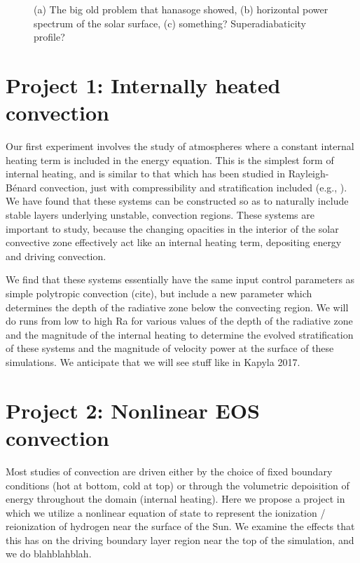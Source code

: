 \documentclass[aasms,12pt]{article}
\newcommand{\RB}{Rayleigh-B\'{e}nard }
\begin{document}
\begin{figure}[t!]
\centering
\caption{(a) The big old problem that hanasoge showed, (b) horizontal power spectrum of the
solar surface, (c) something? Superadiabaticity profile?
        \label{fig:fig1}}
\end{figure}



\section{Project 1: Internally heated convection}
Our first experiment involves the study of atmospheres where a constant internal heating
term is included in the energy equation.  This is the simplest form of internal heating,
and is similar to that which has been studied in \RB convection, just with compressibility
and stratification included (e.g., \citealt{goluskin&spiegel2012}).  
We have found that these systems can be constructed so as to
naturally include stable layers underlying unstable, convection regions.  These systems
are important to study, because the changing opacities in the interior of the solar convective
zone effectively act like an internal heating term, depositing energy and driving convection.

We find that these systems essentially have the same input control parameters as simple polytropic
convection (cite), but include a new parameter which determines the depth of the radiative zone
below the convecting region.  We will do runs from low to high Ra for various values of the
depth of the radiative zone and the magnitude of the internal heating to determine the evolved
stratification of these systems and the magnitude of velocity power at the surface of these
simulations.  We anticipate that we will see stuff like in Kapyla 2017.

\section{Project 2: Nonlinear EOS convection}
Most studies of convection are driven either by the choice of fixed boundary conditions
(hot at bottom, cold at top) or through the volumetric depoisition of energy throughout
the domain (internal heating).  Here we propose a project in which we utilize a nonlinear
equation of state to represent the ionization / reionization of hydrogen near the surface of
the Sun.  We examine the effects that this has on the driving boundary layer region near the
top of the simulation, and we do blahblahblah.
\end{document}
